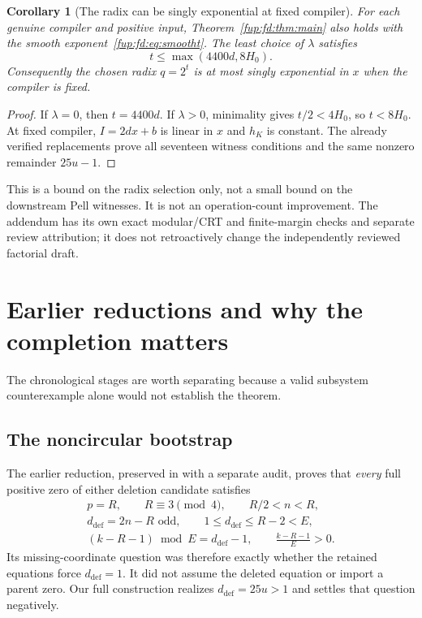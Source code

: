 \documentclass[11pt,letterpaper]{article}
\newtheorem{corollary}[theorem]{Corollary}
\theoremstyle{definition}\newtheorem{definition}[theorem]{Definition}
\theoremstyle{remark}\newtheorem{remark}[theorem]{Remark}
\newcommand{\code}[1]{\texttt{\detokenize{#1}}}
\begin{document}
\begin{corollary}[The radix can be singly exponential at fixed compiler]
For each genuine compiler and positive input, Theorem~\ref{fup:fd:thm:main} also holds with the smooth exponent~\eqref{fup:fd:eq:smootht}. The least choice of $\lambda$ satisfies
\[
 t\le\max(4400d,8H_0).
\]
Consequently the chosen radix $q=2^t$ is at most singly exponential in $x$ when the compiler is fixed.
\end{corollary}
\begin{proof}
If $\lambda=0$, then $t=4400d$. If $\lambda>0$, minimality gives $t/2<4H_0$, so $t<8H_0$. At fixed compiler, $I=2dx+b$ is linear in $x$ and $h_K$ is constant. The already verified replacements prove all seventeen witness conditions and the same nonzero remainder $25u-1$.
\end{proof}
This is a bound on the radix selection only, not a small bound on the downstream Pell witnesses. It is not an operation-count improvement. The addendum has its own exact modular/CRT and finite-margin checks and separate review attribution; it does not retroactively change the independently reviewed factorial draft.

\section{Earlier reductions and why the completion matters}\label{fup:fd:sec:history}
The chronological stages are worth separating because a valid subsystem counterexample alone would not establish the theorem.

\subsection{The noncircular bootstrap}
The earlier reduction, preserved in \code{PROOF.md} with a separate audit, proves that \emph{every} full positive zero of either deletion candidate satisfies
\begin{equation}\label{fup:fd:eq:defectreduction}
 \begin{gathered}
 p=R,\qquad R\equiv3\pmod4,\qquad R/2<n<R,\\
 d_{\mathrm{def}}=2n-R\text{ odd},\qquad1\le d_{\mathrm{def}}\le R-2<E,\\
 (k-R-1)\bmod E=d_{\mathrm{def}}-1,\qquad
 \frac{k-R-1}{E}>0.
 \end{gathered}
\end{equation}
Its missing-coordinate question was therefore exactly whether the retained equations force $d_{\mathrm{def}}=1$. It did not assume the deleted equation or import a parent zero. Our full construction realizes $d_{\mathrm{def}}=25u>1$ and settles that question negatively.
\end{document}
